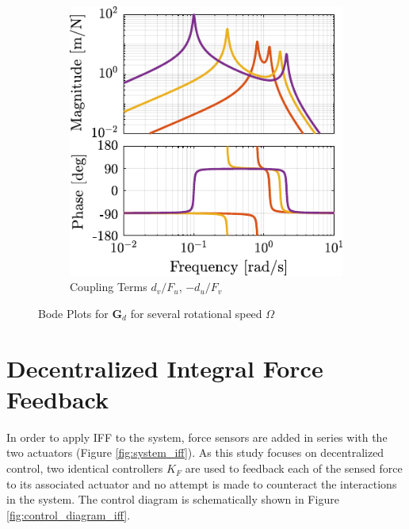 \documentclass[Afour,sagev,times]{sagej}
\begin{document}
\begin{figure}[htbp]
\begin{subfigure}[c]{0.49\linewidth}
\includegraphics[width=\linewidth]{figs/plant_compare_rotating_speed_coupling.pdf}
\caption{\label{fig:plant_compare_rotating_speed_coupling} Coupling Terms \(d_v/F_u\), \(-d_u/F_v\)}
\end{subfigure}
\hfill
\caption{\label{fig:plant_compare_rotating_speed}Bode Plots for \(\bm{G}_d\) for several rotational speed \(\Omega\)}
\centering
\end{figure}

\section{Decentralized Integral Force Feedback}
\label{sec:orgcaa78cf}
\label{sec:iff}
In order to apply IFF to the system, force sensors are added in series with the two actuators (Figure \ref{fig:system_iff}).
As this study focuses on decentralized control, two identical controllers \(K_F\) are used to feedback each of the sensed force to its associated actuator and no attempt is made to counteract the interactions in the system.
The control diagram is schematically shown in Figure \ref{fig:control_diagram_iff}.
\end{document}
